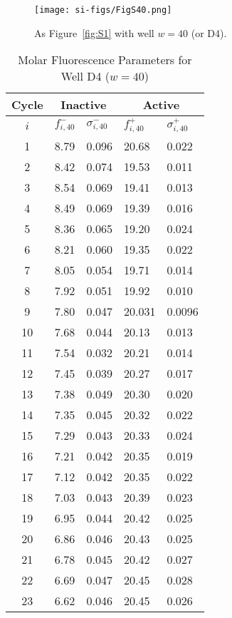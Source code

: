                 \begin{figure}
                    \centering
                    \texttt{[image: si-figs/FigS40.png]}
                    \caption{
                        As Figure~\ref{fig:S1} with well $w=40$ (or D4).
                    }
                \end{figure}
                \clearpage
    \begin{table}
        \caption{Molar Fluorescence Parameters for Well D4 ($w=40$)}
        \centering
        \begin{tabular}{c|ll|ll}
            Cycle & \multicolumn{2}{c|}{Inactive} & \multicolumn{2}{c}{Active} \\
            \hline
            $i$ & $f_{i,40}^{-}$ & $\sigma_{i,40}^{-}$ &  $f_{i,40}^{+}$ & $\sigma_{i,40}^{+}$ \\
            \hline
    1 & 8.79 & 0.096 & 20.68 & 0.022 \\
2 & 8.42 & 0.074 & 19.53 & 0.011 \\
3 & 8.54 & 0.069 & 19.41 & 0.013 \\
4 & 8.49 & 0.069 & 19.39 & 0.016 \\
5 & 8.36 & 0.065 & 19.20 & 0.024 \\
6 & 8.21 & 0.060 & 19.35 & 0.022 \\
7 & 8.05 & 0.054 & 19.71 & 0.014 \\
8 & 7.92 & 0.051 & 19.92 & 0.010 \\
9 & 7.80 & 0.047 & 20.031 & 0.0096 \\
10 & 7.68 & 0.044 & 20.13 & 0.013 \\
11 & 7.54 & 0.032 & 20.21 & 0.014 \\
12 & 7.45 & 0.039 & 20.27 & 0.017 \\
13 & 7.38 & 0.049 & 20.30 & 0.020 \\
14 & 7.35 & 0.045 & 20.32 & 0.022 \\
15 & 7.29 & 0.043 & 20.33 & 0.024 \\
16 & 7.21 & 0.042 & 20.35 & 0.019 \\
17 & 7.12 & 0.042 & 20.35 & 0.022 \\
18 & 7.03 & 0.043 & 20.39 & 0.023 \\
19 & 6.95 & 0.044 & 20.42 & 0.025 \\
20 & 6.86 & 0.046 & 20.43 & 0.025 \\
21 & 6.78 & 0.045 & 20.42 & 0.027 \\
22 & 6.69 & 0.047 & 20.45 & 0.028 \\
23 & 6.62 & 0.046 & 20.45 & 0.026 \\

\end{tabular}
\end{table}
